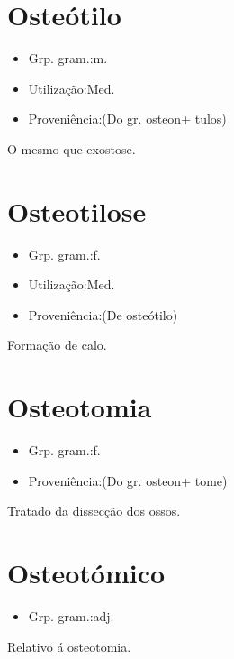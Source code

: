 \section{Osteótilo}
\begin{itemize}
\item {Grp. gram.:m.}
\end{itemize}
\begin{itemize}
\item {Utilização:Med.}
\end{itemize}
\begin{itemize}
\item {Proveniência:(Do gr. \textunderscore osteon\textunderscore  + \textunderscore tulos\textunderscore )}
\end{itemize}
O mesmo que \textunderscore exostose\textunderscore .
\section{Osteotilose}
\begin{itemize}
\item {Grp. gram.:f.}
\end{itemize}
\begin{itemize}
\item {Utilização:Med.}
\end{itemize}
\begin{itemize}
\item {Proveniência:(De \textunderscore osteótilo\textunderscore )}
\end{itemize}
Formação de calo.
\section{Osteotomia}
\begin{itemize}
\item {Grp. gram.:f.}
\end{itemize}
\begin{itemize}
\item {Proveniência:(Do gr. \textunderscore osteon\textunderscore  + \textunderscore tome\textunderscore )}
\end{itemize}
Tratado da dissecção dos ossos.
\section{Osteotómico}
\begin{itemize}
\item {Grp. gram.:adj.}
\end{itemize}
Relativo á osteotomia.
